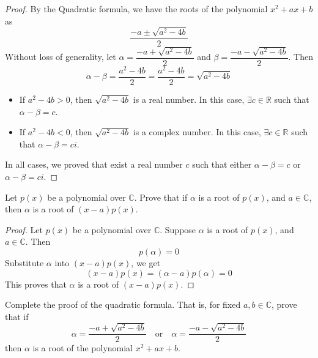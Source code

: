 \begin{solutions*}
    \fixlistskip
    \begin{proof}
    By the Quadratic formula, we have the roots of the polynomial $x^2+ax+b$ as
    \[
    \frac{-a \pm \sqrt{a^2-4b}}{2}
    \]
    Without loss of generality, let $\alpha = \dfrac{-a+\sqrt{a^2-4b}}{2}$ and $\beta = \dfrac{-a-\sqrt{a^2-4b}}{2}$. Then
    \[
    \alpha-\beta = \dfrac{a^2-4b}{2} = \dfrac{a^2-4b}{2} = \sqrt{a^2-4b}
    \]
    \begin{itemize}
        \item If $a^2-4b > 0$, then $\sqrt{a^2-4b}$ is a real number. In this case, $\exists c \in \mathbb{R}$ such that $\alpha-\beta = c$.
        \item If $a^2-4b < 0$, then $\sqrt{a^2-4b}$ is a complex number. In this case, $\exists c \in \mathbb{R}$ such that $\alpha - \beta = ci$.
    \end{itemize}
    In all cases, we proved that exist a real number $c$ such that either $\alpha-\beta = c$ or $\alpha - \beta = ci$.  
    \end{proof}
\end{solutions*}


\begin{exercise}
Let $p(x)$ be a polynomial over $\mathbb{C}$. Prove that if $\alpha$ is a root of $p(x)$, and $a \in \mathbb{C}$, then $\alpha$ is a root of $(x-a)p(x)$.
\end{exercise}

\begin{solutions*}
    \fixlistskip
    \begin{proof}
    Let $p(x)$ be a polynomial over $\mathbb{C}$. Suppose $\alpha$ is a root of $p(x)$, and $a \in \mathbb{C}$. Then
    \[
    p(\alpha) = 0
    \]
    Substitute $\alpha$ into $(x-a)p(x)$, we get
    \[
    (x-a)p(x) = (\alpha-a)p(\alpha) = 0
    \]
    This proves that $\alpha$ is a root of $(x-a)p(x)$.
    \end{proof}
\end{solutions*}

\begin{exercise}
\label{exQuadraticFormulaConverse}
Complete the proof of the quadratic formula. That is, for fixed $a,b \in \mathbb{C}$, prove that if
\[
\alpha = \frac{-a+\sqrt{a^2-4b}}{2} \quad \text{or} \quad \alpha =\frac{-a-\sqrt{a^2-4b}}{2}
\]
then $\alpha$ is a root of the polynomial $x^2+ax+b$.
\end{exercise}

